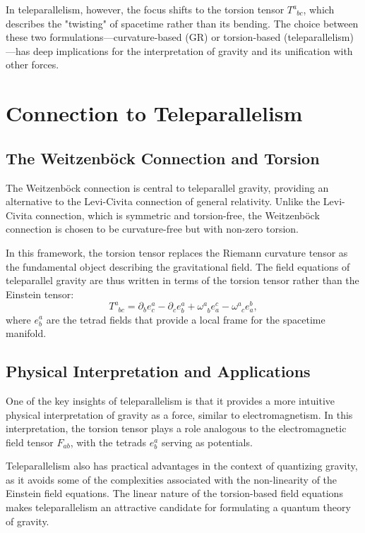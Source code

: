 \documentclass[12pt]{article}
\begin{document}
In teleparallelism, however, the focus shifts to the torsion tensor \( T^a_{\phantom{a}bc} \), which describes the "twisting" of spacetime rather than its bending. The choice between these two formulations—curvature-based (GR) or torsion-based (teleparallelism)—has deep implications for the interpretation of gravity and its unification with other forces.

\section{Connection to Teleparallelism}
\subsection{The Weitzenböck Connection and Torsion}
The Weitzenböck connection is central to teleparallel gravity, providing an alternative to the Levi-Civita connection of general relativity. Unlike the Levi-Civita connection, which is symmetric and torsion-free, the Weitzenböck connection is chosen to be curvature-free but with non-zero torsion.

In this framework, the torsion tensor replaces the Riemann curvature tensor as the fundamental object describing the gravitational field. The field equations of teleparallel gravity are thus written in terms of the torsion tensor rather than the Einstein tensor:
\begin{equation}
T^a_{\phantom{a}bc} = \partial_b e^a_c - \partial_c e^a_b + \omega^a_{\phantom{a}b} e^c_a - \omega^a_{\phantom{a}c} e^b_a,
\end{equation}
where \( e^a_b \) are the tetrad fields that provide a local frame for the spacetime manifold.

\subsection{Physical Interpretation and Applications}
One of the key insights of teleparallelism is that it provides a more intuitive physical interpretation of gravity as a force, similar to electromagnetism. In this interpretation, the torsion tensor plays a role analogous to the electromagnetic field tensor \( F_{ab} \), with the tetrads \( e^a_b \) serving as potentials.

Teleparallelism also has practical advantages in the context of quantizing gravity, as it avoids some of the complexities associated with the non-linearity of the Einstein field equations. The linear nature of the torsion-based field equations makes teleparallelism an attractive candidate for formulating a quantum theory of gravity.
\end{document}
